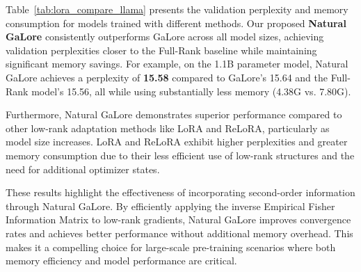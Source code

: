 Table~\ref{tab:lora_compare_llama} presents the validation perplexity and memory consumption for models trained with different methods. Our proposed \textbf{Natural GaLore} consistently outperforms GaLore across all model sizes, achieving validation perplexities closer to the Full-Rank baseline while maintaining significant memory savings. For example, on the 1.1B parameter model, Natural GaLore achieves a perplexity of \textbf{15.58} compared to GaLore's 15.64 and the Full-Rank model's 15.56, all while using substantially less memory (4.38G vs. 7.80G).

Furthermore, Natural GaLore demonstrates superior performance compared to other low-rank adaptation methods like LoRA and ReLoRA, particularly as model size increases. LoRA and ReLoRA exhibit higher perplexities and greater memory consumption due to their less efficient use of low-rank structures and the need for additional optimizer states.

These results highlight the effectiveness of incorporating second-order information through Natural GaLore. By efficiently applying the inverse Empirical Fisher Information Matrix to low-rank gradients, Natural GaLore improves convergence rates and achieves better performance without additional memory overhead. This makes it a compelling choice for large-scale pre-training scenarios where both memory efficiency and model performance are critical.

\vspace{-2mm}




